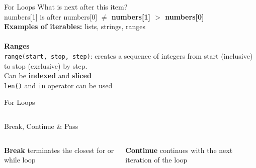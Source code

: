         \begin{frame}{For Loops}
            \LARGE
            What is next after this item?\\
            numbers[1] is after numbers[0]
            \pause
             \textbf{$\neq$ numbers[1] $>$ numbers[0]}\\
            \pause
            \textbf{Examples of iterables:}
            \pause
             lists,
            \pause
             strings,
            \pause
             ranges\\
            \pause
            \huge
            \\
            \textbf{Ranges}\\
            \LARGE
            \texttt{range(start, stop, step)}: creates a sequence of integers from start (inclusive) to stop (exclusive) by step.\\
            Can be \textbf{indexed} and \textbf{sliced}\\
            \texttt{len()} and \texttt{in} operator can be used
        \end{frame}

        \begin{frame}{For Loops}
            \inputminted[frame=single,framesep=2pt]{python3}{code-examples/for_loops.py}
        \end{frame}

        \begin{frame}{Break, Continue \& Pass}
            \begin{columns}
                \begin{column}{0.5\textwidth}
                    \textbf{Break}
                    terminates the closest for or while loop
                    \bigskip  
                    \inputminted[frame=single,framesep=2pt]{python3}{../Lecture3/code-examples/break1.py}
                    \inputminted[frame=single,framesep=2pt]{python3}{../Lecture3/code-examples/break2.py}
                \end{column}
                \begin{column}{0.5\textwidth}
                    \textbf{Continue}
                    continues with the next iteration of the loop
                    \bigskip  
                    \inputminted[frame=single,framesep=2pt]{python3}{../Lecture3/code-examples/continue1.py}
                    \inputminted[frame=single,framesep=2pt]{python3}{../Lecture3/code-examples/continue2.py}
                \end{column} 
            \end{columns}
        \end{frame}
        
